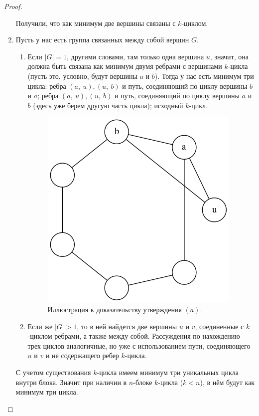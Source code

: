 \begin{solution}
\begin{proof}
\begin{enumerate}
    Получили, что как минимум две вершины связаны с $k$-циклом.
    
    \item Пусть у нас есть группа связанных между собой вершин $G$.
    
    \begin{enumerate}
        \item Если $|G| = 1$, другими словами, там только одна вершина $u$, значит, она должна быть связана как минимум двумя  ребрами с вершинами $k$-цикла (пусть это, условно, будут вершины $a$ и $b$). Тогда у нас есть минимум три цикла: ребра $(a,~u), (u,~b)$ и путь, соединяющий по циклу вершины $b$ и $a$; ребра $(a,~u), (u,~b)$ и путь, соединяющий по циклу вершины $a$ и $b$ (здесь уже берем другую часть цикла); исходный $k$-цикл.
        
        \begin{figure}[H]
            \centering
            \includegraphics[scale=0.4]{Fall/img/solution-441_for_the_proposition.dot.png}
            \caption{Иллюстрация к доказательству утверждения $(a)$.} \label{cycle for the theorem b}
        \end{figure}
        
        \item Если же $|G| > 1$, то в ней найдется две вершины $u$ и $v$, соединенные с $k$-циклом ребрами, а также между собой. Рассуждения по нахождению трех циклов аналогичные, но уже с использованием пути, соединяющего $u$ и $v$ и не содержащего ребер $k$-цикла.
    \end{enumerate}
    
    С учетом существования $k$-цикла имеем минимум три уникальных цикла внутри блока. Значит при наличии в $n$-блоке $k$-цикла ($k < n$), в нём будут как минимум три цикла.
\end{enumerate}
\end{proof}


\end{solution}
